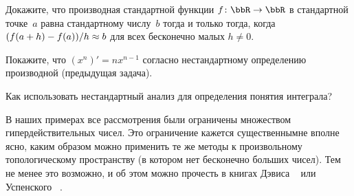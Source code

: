 \begin{problem}\label{derivative-non-standard}
Докажите, что производная%
%
стандартной функции
$f\colon\bbR\hm\to\bbR$ в стандартной точке~$a$ равна
стандартному числу~$b$ тогда и только тогда, когда
${(f(a+h)-f(a))/h}\hm\approx b$ для всех бесконечно малых ${h\ne
0}$.
\end{problem}

\begin{problem}
Покажите, что $(x^n)'=nx^{n-1}$ согласно нестандартному
определению производной (предыдущая задача).
\end{problem}

\begin{problem}
Как использовать нестандартный анализ для определения
понятия интеграла?%
%
\end{problem}

В наших примерах все рассмотрения были ограничены множеством
гипердействительных чисел. Это ограничение кажется
существенным\т не вполне ясно, каким образом можно применить те
же методы к произвольному топологическому пространству (в
котором нет бесконечно больших чисел). Тем не менее это
возможно, и об этом можно прочесть в книгах
Дэвиса%
%
~\cite{davis-nonstandard} или
Ус\-пенского%
%
~\cite{uspensky-nonstandard}.
